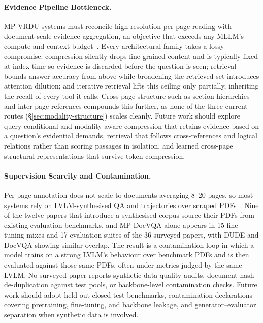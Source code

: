 \documentclass[11pt]{article}
\begin{document}
\paragraph{Evidence Pipeline Bottleneck.}
\label{sec:chal-evidence}
MP-VRDU systems must reconcile high-resolution per-page reading with document-scale evidence aggregation, an objective that exceeds any MLLM's compute and context budget~\cite{ma2024mmlongbench}. Every architectural family takes a lossy compromise: compression silently drops fine-grained content and is typically fixed at index time so evidence is discarded before the question is seen; retrieval bounds answer accuracy from above while broadening the retrieved set introduces attention dilution; and iterative retrieval lifts this ceiling only partially, inheriting the recall of every tool it calls. Cross-page structure such as section hierarchies and inter-page references compounds this further, as none of the three current routes (§\ref{sec:modality-structure}) scales cleanly. Future work should explore query-conditional and modality-aware compression that retains evidence based on a question's evidential demands, retrieval that follows cross-references and logical relations rather than scoring passages in isolation, and learned cross-page structural representations that survive token compression.

\paragraph{Supervision Scarcity and Contamination.}
\label{sec:chal-sup}
Per-page annotation does not scale to documents averaging 8–20 pages, so most systems rely on LVLM-synthesised QA and trajectories over scraped PDFs~\cite{tanaka2024instructdoc, jain2025simpledoc, xiong2026docr1, zhang2026docdancer}. Nine of the twelve papers that introduce a synthesised corpus source their PDFs from existing evaluation benchmarks, and MP-DocVQA alone appears in 15 fine-tuning mixes and 17 evaluation suites of the 36 surveyed papers, with DUDE and DocVQA showing similar overlap. The result is a contamination loop in which a model trains on a strong LVLM's behaviour over benchmark PDFs and is then evaluated against those same PDFs, often under metrics judged by the same LVLM. No surveyed paper reports synthetic-data quality audits, document-hash de-duplication against test pools, or backbone-level contamination checks. Future work should adopt held-out closed-test benchmarks, contamination declarations covering pretraining, fine-tuning, and backbone leakage, and generator–evaluator separation when synthetic data is involved.
\end{document}
